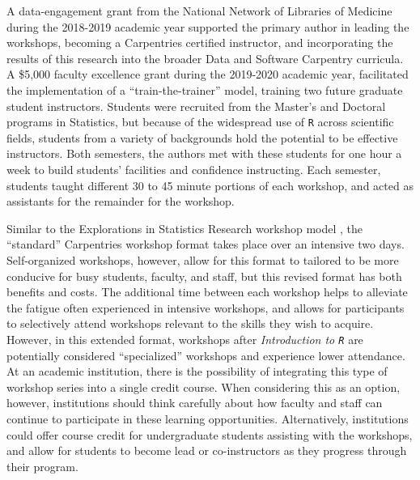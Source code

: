 \documentclass[12pt]{article}
\begin{document}
\quad A data-engagement grant from the National Network of Libraries of Medicine
during the 2018-2019 academic year supported the primary author in leading the
workshops, becoming a Carpentries certified instructor, and incorporating the
results of this research into the broader Data and Software Carpentry curricula.
A \$5,000 faculty excellence grant during the 2019-2020 academic year,
facilitated the implementation of a ``train-the-trainer'' model, training two 
future graduate student instructors. Students were recruited from the Master's
and Doctoral programs in Statistics, but because of the widespread use of 
\texttt{R} across scientific fields, students from a variety of backgrounds hold
the potential to be effective instructors. Both semesters, the authors met with 
these students for one hour a week to build students' facilities and confidence
instructing. Each semester, students taught different 30 to 45 minute portions
of each workshop, and acted as assistants for the remainder for the workshop.  


\quad Similar to the Explorations in Statistics Research workshop model
\citep{esr}, the ``standard'' Carpentries workshop format takes place over an
intensive two days. Self-organized workshops, however, allow for this format to
tailored to be more conducive for busy students, faculty, and staff, but this
revised format has both benefits and costs. The additional time between each
workshop helps to alleviate the fatigue often experienced in intensive
workshops, and allows for participants to selectively attend workshops relevant
to the skills they wish to acquire. However, in this extended format, workshops
after \emph{Introduction to \texttt{R}} are potentially
considered ``specialized'' workshops and experience lower attendance. At an
academic institution, there is the possibility of integrating this type of
workshop series into a single credit course. When considering this as an option,
however, institutions should think carefully about how faculty and staff can 
continue to participate in these learning opportunities. Alternatively,
institutions could offer course credit for undergraduate students assisting with 
the workshops, and allow for students to become lead or co-instructors as they
progress through their program.
\end{document}
